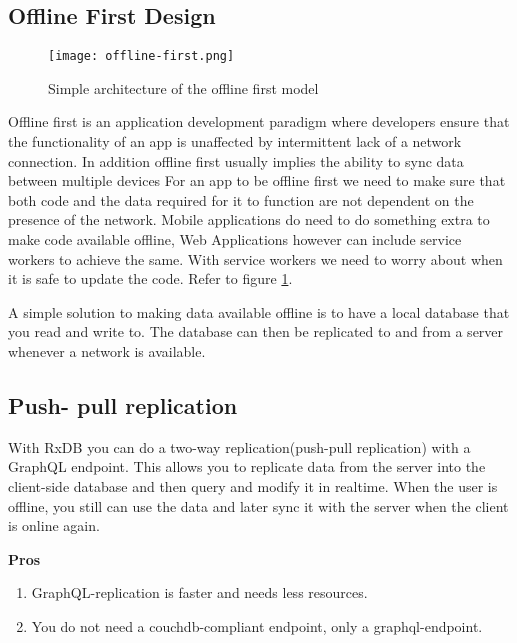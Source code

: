 \subsection{Offline First Design}

\begin{figure}[h!]
    \begin{center}
        \texttt{[image: offline-first.png]}
    \end{center}
    \caption{Simple architecture of the offline first model}
    \label{fig:offline-first}
\end{figure}

Offline first is an application development paradigm where developers ensure that the 
functionality of an app is unaffected by intermittent lack of a network connection. 
In addition offline first usually implies the ability to sync data between multiple devices
For an app to be offline first we need to make sure that both code and the data required 
for it to function are not dependent on the presence of the network.
Mobile applications do need to do something extra to make code available offline,
Web Applications however can include service workers to achieve the same.
With service workers we need to worry about when it is safe to update the code. 
Refer to figure \ref{fig:offline-first}.

A simple solution to making data available offline is to have a local database 
that you read and write to. The database can then be replicated to and from a 
server whenever a network is available.


\subsection{Push- pull replication}

With RxDB you can do a two-way replication(push-pull replication) with a GraphQL endpoint. 
This allows you to replicate data from the server into the client-side database and then 
query and modify it in realtime.
When the user is offline, you still can use the data and later sync it with the server 
when the client is online again.

\textbf{Pros}
\begin{enumerate}
    \item GraphQL-replication is faster and needs less resources.
    \item You do not need a couchdb-compliant endpoint, only a graphql-endpoint.
\end{enumerate}

